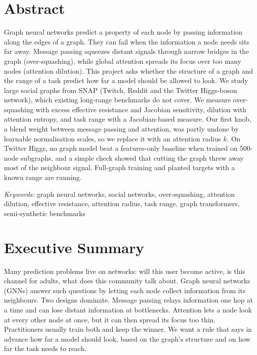 
\section*{Abstract}
\noindent Graph neural networks predict a property of each node by passing information along the edges of a graph. They can fail when the information a node needs sits far away. Message passing squeezes distant signals through narrow bridges in the graph (over-squashing), while global attention spreads its focus over too many nodes (attention dilution). This project asks whether the structure of a graph and the range of a task predict how far a model should be allowed to look. We study large social graphs from SNAP (Twitch, Reddit and the Twitter Higgs-boson network), which existing long-range benchmarks do not cover. We measure over-squashing with excess effective resistance and Jacobian sensitivity, dilution with attention entropy, and task range with a Jacobian-based measure. Our first knob, a blend weight between message passing and attention, was partly undone by learnable normalisation scales, so we replace it with an attention radius $k$. On Twitter Higgs, no graph model beat a features-only baseline when trained on 500-node subgraphs, and a simple check showed that cutting the graph threw away most of the neighbour signal. Full-graph training and planted targets with a known range are running.

\vspace{1in}
\noindent\textit{Keywords:} graph neural networks, social networks, over-squashing, attention dilution, effective resistance, attention radius, task range, graph transformers, semi-synthetic benchmarks

\newpage
\section*{Executive Summary}
Many prediction problems live on networks: will this user become active, is this channel for adults, what does this community talk about. Graph neural networks (GNNs) answer such questions by letting each node collect information from its neighbours. Two designs dominate. Message passing relays information one hop at a time and can lose distant information at bottlenecks. Attention lets a node look at every other node at once, but it can then spread its focus too thin. Practitioners usually train both and keep the winner. We want a rule that says in advance how far a model should look, based on the graph's structure and on how far the task needs to reach.

